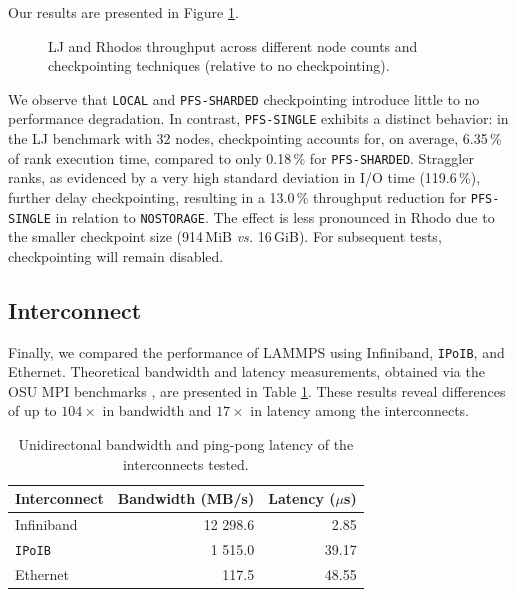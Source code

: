 \documentclass[sigplan, nonacm, screen]{acmart}
\begin{document}
Our results are presented in Figure \ref{storage-plot}.

\begin{figure}[h]
    
    \caption{
        LJ and Rhodos throughput across different node counts and checkpointing techniques (relative
        to no checkpointing).
    }
    \label{storage-plot}
\end{figure}

We observe that \texttt{LOCAL} and \texttt{PFS-SHARDED} checkpointing introduce little to no
performance degradation. In contrast, \texttt{PFS-SINGLE} exhibits a distinct behavior: in the LJ
benchmark with 32 nodes, checkpointing accounts for, on average, 6.35\,\% of rank execution time,
compared to only 0.18\,\% for \texttt{PFS-SHARDED}. Straggler ranks, as evidenced by a very high
standard deviation in I/O time (119.6\,\%), further delay checkpointing, resulting in a 13.0\,\%
throughput reduction for \texttt{PFS-SINGLE} in relation to \texttt{NOSTORAGE}. The effect is less
pronounced in Rhodo due to the smaller checkpoint size (914\,MiB \emph{vs.} 16\,GiB). For subsequent
tests, checkpointing will remain disabled.

\subsection{Interconnect} %
\label{tuning-interconnect}

Finally, we compared the performance of LAMMPS using Infiniband, \texttt{IPoIB}, and Ethernet.
Theoretical bandwidth and latency measurements, obtained via the OSU MPI benchmarks \cite{osu},
are presented in Table \ref{osu-results}. These results reveal differences of up to $104\times$ in
bandwidth and $17\times$ in latency among the interconnects.

\begin{table}[h]
    \caption{Unidirectonal bandwidth and ping-pong latency of the interconnects tested.}
    \label{osu-results}

    \begin{tabular}{lrr}
        \toprule
        Interconnect   &  Bandwidth (MB/s) & Latency ($\mu$s) \\
        \midrule
        Infiniband     &         12 298.6 &                 2.85 \\
        \texttt{IPoIB} &          1 515.0 &                39.17 \\
        Ethernet       &            117.5 &                48.55 \\
        \bottomrule
    \end{tabular}
\end{table}
\end{document}
